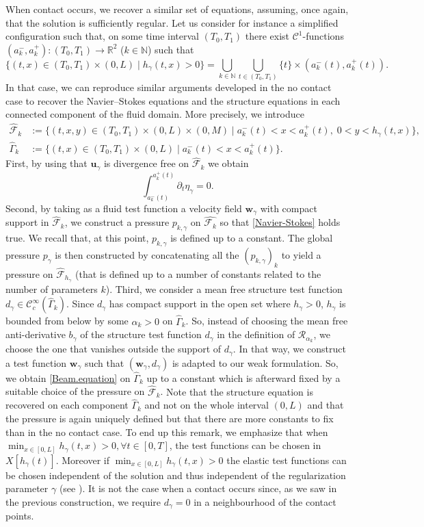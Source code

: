 \documentclass[JEP,XML,SOM,Unicode,NoFloatCountersInSection]{cedram}
\let\mathcal\mathscr
\let\sep\mid
\theoremstyle{remark}
\theoremstyle{definition}
\newcommand{\ug}{\boldsymbol{u}}
\newcommand{\wg}{\boldsymbol{w}}
\begin{document}
When contact occurs, we recover a similar set of equations, assuming, once again, that the solution is sufficiently regular. Let us consider for instance a simplified configuration such that, on some time interval $(T_0,T_1)$ there exist $\mathcal C^1$-functions $(a_k^{-},a_k^+): (T_0,T_1) \to \mathbb R^2$ ($k\in \mathbb N$) such that
\[
\{(t,x) \in (T_0,T_1 )\times(0,L) \sep h_\gamma(t,x) >0 \} = \bigcup_{k\in\mathbb N} \bigcup_{t\in (T_0,T_1)} \{t\} \times (a_k^{-}(t),a_{k}^+(t)).
\]
In that case, we can reproduce similar arguments developed in the no contact case to recover the Navier--Stokes equations
and the structure equations in each connected component of the fluid domain.
More precisely, we introduce
\begin{align*}
\hat{\mathcal F}_k &:= \{(t,x,y) \in (T_0,T_1) \times (0,L) \times (0,M)\mid a_k^{-}(t) < x < a_k^{+}(t), \; 0 < y < h_{\gamma}(t,x) \},
\\
\hat{\Gamma}_k &:= \{(t,x) \in (T_0,T_1) \times (0,L)\mid a_k^{-}(t) < x < a_k^{+}(t) \}.
\end{align*}
First, by using that $\ug_{\gamma}$ is divergence free on $\hat{\mathcal F}_{k}$ we obtain
\[
\int_{a_{k}^{-}(t)}^{a_k^{+}(t)} \partial_t \eta_{\gamma} = 0.
\]
Second, by taking as a fluid test function a velocity field $\wg_{\gamma}$ with compact support in $\hat{\mathcal F}_k$,
we construct a pressure $p_{k,\gamma}$ on $\hat{\mathcal F_{k}}$ so that \eqref{Navier-Stokes} holds true.
We recall that, at this point, $p_{k,\gamma}$ is defined up to a constant. The global
pressure $p_{\gamma}$ is then constructed by concatenating all the $(p_{k,\gamma})_{k}$ to yield a pressure on $\hat{\mathcal F}_{h_{\gamma}}$
(that is defined up to a number of constants related to the number of parameters $k$).
Third, we consider a mean free structure test function $d_{\gamma} \in \mathcal{C}^{\infty}_c(\hat{\Gamma}_{k})$. Since $d_{\gamma}$
has compact support in the open set where $h_{\gamma} >0 $, $h_{\gamma}$ is bounded from below by some $\alpha_k>0$ on $\hat{\Gamma}_k$. So, instead of choosing the mean free anti-derivative $b_{\gamma}$ of the structure test function $d_{\gamma}$ in the definition of $\mathcal R_{{\alpha}_k}$, we choose the one that vanishes outside the support of $d_{\gamma}$.
In that way, we construct a test function $\wg_{\gamma}$ such that $(\wg_{\gamma},d_{\gamma})$ is adapted to our weak formulation. So, we
obtain \eqref{Beam.equation} on $\hat{\Gamma}_{k}$ up to a constant which is afterward fixed by a suitable choice of the pressure
on $\hat{\mathcal F}_{k}$. {Note that the structure equation is recovered on each component $\hat{\Gamma}_{k}$ and not on the whole interval $(0, L)$} and that the pressure is again uniquely defined but that there are more constants to fix than in the no contact case.
To end up this remark, we emphasize that when $\min_{x\in [0, L]}h_\gamma(t, x)>0, \forall t\in [0, T]$, the test functions can be chosen in $X[h_\gamma(t)]$. Moreover if $\min_{x\in [0, L]}h_\gamma(t, x)>0$ the elastic test functions can be chosen independent of the solution and thus independent of the regularization parameter $\gamma$ (see \cite{Chambolle-etal}). It is not the case when a contact occurs since, as we saw in the previous construction, we require $d_\gamma=0$ in a neighbourhood of the contact points.
\end{document}
